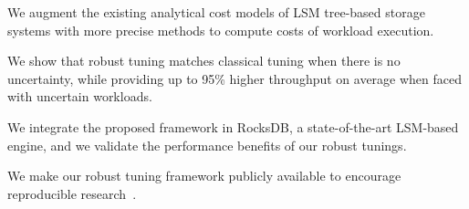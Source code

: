     \item We augment the existing analytical cost models of LSM tree-based storage systems
        with more precise methods to compute costs of workload execution.
	\item We show that robust tuning matches classical tuning when there is 
        no uncertainty, while providing up to 95\% higher throughput
        on average when faced with uncertain workloads.
	\item We integrate the proposed framework in RocksDB, a state-of-the-art LSM-based engine, and we validate the performance benefits of our robust tunings.
    \item We make our robust tuning framework publicly available to encourage
        reproducible research~\cite{github-repo}.
\squishend
